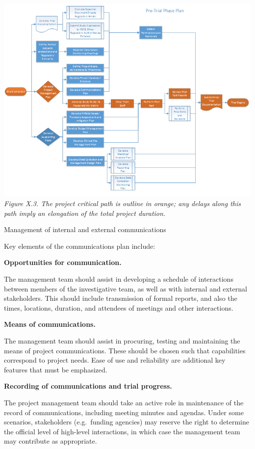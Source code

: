 \documentclass[]{book}
\begin{document}
\includegraphics{images/book/pm4.png} \emph{Figure X.3. The project
critical path is outline in orange; any delays along this path imply an
elongation of the total project duration. }

Management of internal and external communications

Key elements of the communications plan include:

\textbf{Opportunities for communication. }

The management team should assist in developing a schedule of
interactions between members of the investigative team, as well as with
internal and external stakeholders. This should include transmission of
formal reports, and also the times, locations, duration, and attendees
of meetings and other interactions.

\textbf{Means of communications.}

The management team should assist in procuring, testing and maintaining
the means of project communications. These should be chosen such that
capabilities correspond to project needs. Ease of use and reliability
are additional key features that must be emphasized.

\textbf{Recording of communications and trial progress. }

The project management team should take an active role in maintenance of
the record of communications, including meeting minutes and agendas.
Under some scenarios, stakeholders (e.g.~funding agencies) may reserve
the right to determine the official level of high-level interactions, in
which case the management team may contribute as appropriate.
\end{document}

